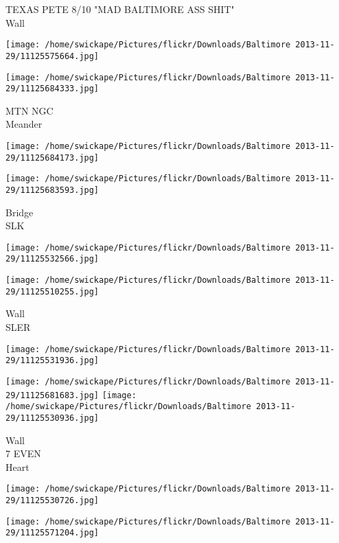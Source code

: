 \documentclass[10pt,letterpaper]{article}
\begin{document}
TEXAS PETE 8/10 "MAD BALTIMORE ASS SHIT"\\
Wall\\
\pagebreak

\texttt{[image: /home/swickape/Pictures/flickr/Downloads/Baltimore 2013-11-29/11125575664.jpg]}

\vspace{0.25in}
\texttt{[image: /home/swickape/Pictures/flickr/Downloads/Baltimore 2013-11-29/11125684333.jpg]}

MTN NGC\\
Meander\\
\pagebreak

\texttt{[image: /home/swickape/Pictures/flickr/Downloads/Baltimore 2013-11-29/11125684173.jpg]}

\vspace{0.25in}
\texttt{[image: /home/swickape/Pictures/flickr/Downloads/Baltimore 2013-11-29/11125683593.jpg]}

Bridge\\
SLK\\
\pagebreak

\texttt{[image: /home/swickape/Pictures/flickr/Downloads/Baltimore 2013-11-29/11125532566.jpg]}

\vspace{0.25in}
\texttt{[image: /home/swickape/Pictures/flickr/Downloads/Baltimore 2013-11-29/11125510255.jpg]}

Wall\\
SLER\\
\pagebreak

\texttt{[image: /home/swickape/Pictures/flickr/Downloads/Baltimore 2013-11-29/11125531936.jpg]}

\vspace{0.25in}
\texttt{[image: /home/swickape/Pictures/flickr/Downloads/Baltimore 2013-11-29/11125681683.jpg]}
\texttt{[image: /home/swickape/Pictures/flickr/Downloads/Baltimore 2013-11-29/11125530936.jpg]}

Wall\\
7 EVEN\\
Heart\\
\pagebreak

\texttt{[image: /home/swickape/Pictures/flickr/Downloads/Baltimore 2013-11-29/11125530726.jpg]}

\vspace{0.25in}
\texttt{[image: /home/swickape/Pictures/flickr/Downloads/Baltimore 2013-11-29/11125571204.jpg]}
\end{document}
